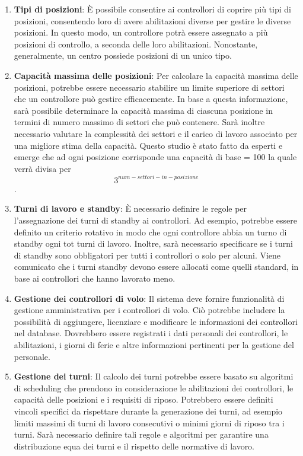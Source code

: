 \begin{enumerate}
\item \textbf{Tipi di posizioni}: È possibile consentire ai controllori di coprire più tipi di posizioni, consentendo loro di avere abilitazioni diverse per gestire le diverse posizioni. In questo modo, un controllore potrà essere assegnato a più posizioni di controllo, a seconda delle loro abilitazioni. Nonostante, generalmente, un centro possiede posizioni di un unico tipo.

\item \textbf{Capacità massima delle posizioni}: Per calcolare la capacità massima delle posizioni, potrebbe essere necessario stabilire un limite superiore di settori che un controllore può gestire efficacemente. In base a questa informazione, sarà possibile determinare la capacità massima di ciascuna posizione in termini di numero massimo di settori che può contenere. Sarà inoltre necessario valutare la complessità dei settori e il carico di lavoro associato per una migliore stima della capacità. Questo studio è stato fatto da esperti e emerge che ad ogni posizione corrisponde una capacità di base = 100 la quale verrà divisa per \[  3^{num-settori-in-posizione} \].

\item \textbf{Turni di lavoro e standby}: È necessario definire le regole per l'assegnazione dei turni di standby ai controllori. Ad esempio, potrebbe essere definito un criterio rotativo in modo che ogni controllore abbia un turno di standby ogni tot turni di lavoro. Inoltre, sarà necessario specificare se i turni di standby sono obbligatori per tutti i controllori o solo per alcuni. Viene comunicato che i turni standby devono essere allocati come quelli standard, in base ai controllori che hanno lavorato meno.

\item \textbf{Gestione dei controllori di volo}: Il sistema deve fornire funzionalità di gestione amministrativa per i controllori di volo. Ciò potrebbe includere la possibilità di aggiungere, licenziare e modificare le informazioni dei controllori nel database. Dovrebbero essere registrati i dati personali dei controllori, le abilitazioni, i giorni di ferie e altre informazioni pertinenti per la gestione del personale.

\item \textbf{Gestione dei turni}: Il calcolo dei turni potrebbe essere basato su algoritmi di scheduling che prendono in considerazione le abilitazioni dei controllori, le capacità delle posizioni e i requisiti di riposo. Potrebbero essere definiti vincoli specifici da rispettare durante la generazione dei turni, ad esempio limiti massimi di turni di lavoro consecutivi o minimi giorni di riposo tra i turni. Sarà necessario definire tali regole e algoritmi per garantire una distribuzione equa dei turni e il rispetto delle normative di lavoro.


\end{enumerate}
